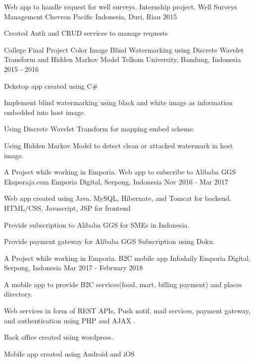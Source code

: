 \begin{cventries}
\cventry
    {Web app to handle request for well surveys. Internship project.}
    {Well Surveys Management}
    {Chevron Pacific Indonesia, Duri, Riau}
    {2015}
    {
        \begin{cvitems}
            \item {Created Auth and CRUD services to manage requests}
        \end{cvitems}
    }

    
\cventry
    {College Final Project}
    {Color Image Blind Watermarking using Discrete Wavelet Transform and Hidden Markov Model}
    {Telkom University, Bandung, Indonesia}
    {2015 - 2016}
    {
        \begin{cvitems}
            \item {Dekstop app created using C\#}
            \item {Implement blind watermarking using black and white image as information embedded into host image.}
            \item {Using Discrete Wavelet Transform for mapping embed scheme.}
            \item {Using Hidden Markov Model to detect clean or attacked watermark in host image.}
        \end{cvitems}
    }

\cventry
    {A Project while working in Emporia. Web app to subscribe to Alibaba GGS}
    {Eksporaja.com}
    {Emporia Digital, Serpong, Indonesia}
    {Nov 2016 - Mar 2017}
    {
        \begin{cvitems}
            \item {Web app created using Java, MySQL, Hibernate, and Tomcat for backend. HTML/CSS, Javascript, JSP for frontend}
            \item {Provide subscription to Alibaba GGS for SMEs in Indonesia.}
            \item {Provide payment gateway for Alibaba GGS Subscription using Doku.}
        \end{cvitems}
    }

\cventry
    {A Project while working in Emporia. B2C mobile app}
    {Infodaily}
    {Emporia Digital, Serpong, Indonesia}
    {Mar 2017 - February 2018}
    {
        \begin{cvitems}
            \item {A mobile app to provide B2C services(food, mart, billing payment) and places directory.}
            \item {Web services in form of REST APIs, Push notif, mail services, payment gateway, and authentication using PHP and AJAX .}
            \item {Back office created using wordpress.}
            \item {Mobile app created using Android and iOS}
        \end{cvitems}
    }
\end{cventries}
